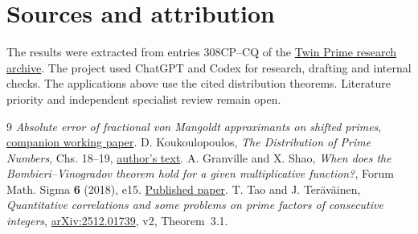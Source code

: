 \documentclass[11pt]{article}
\begin{document}
\section*{Sources and attribution}
The results were extracted from entries 308CP--CQ of the
\href{https://github.com/cosmosgeek0/Twin-Prime/tree/main/history}
{Twin Prime research archive}. The project used ChatGPT and Codex
for research, drafting and internal checks. The applications above
use the cited distribution theorems. Literature priority and
independent specialist review remain open.

\begin{thebibliography}{9}
\emph{Absolute error of fractional von Mangoldt approximants on
shifted primes}, \href{https://github.com/cosmosgeek0/Twin-Prime}
{companion working paper}.
 D. Koukoulopoulos, \emph{The Distribution of Prime
Numbers}, Chs. 18--19,
\href{https://dms.umontreal.ca/~koukoulo/documents/publications/primes.pdf}{author's text}.
 A. Granville and X. Shao, \emph{When does the
Bombieri--Vinogradov theorem hold for a given multiplicative
function?}, Forum Math. Sigma \textbf{6} (2018), e15.
\href{https://doi.org/10.1017/fms.2018.14}{Published paper}.
 T. Tao and J. Ter\"av\"ainen,
\emph{Quantitative correlations and some problems on prime
factors of consecutive integers},
\href{https://arxiv.org/abs/2512.01739}{arXiv:2512.01739}, v2, Theorem~3.1.
\end{thebibliography}
\end{document}
